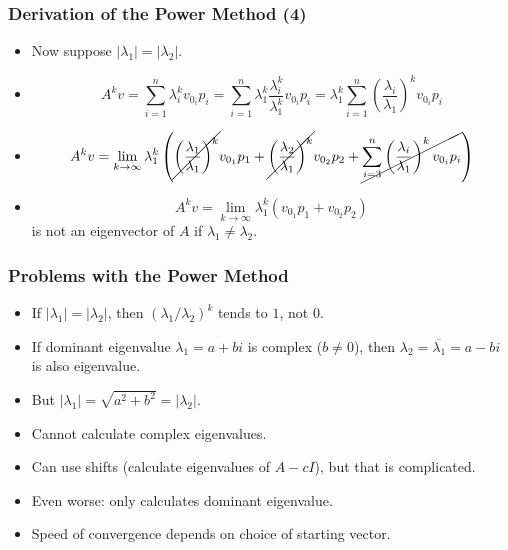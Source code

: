 \documentclass{beamer}
\begin{document}
\begin{frame}
	\frametitle{Derivation of the Power Method (4)}
	\begin{itemize}
		\item<1-> Now suppose $\left|\lambda_1\right|=\left|\lambda_2\right|$.
		\item<2->[]
		\begin{equation*}
			A^kv=\sum_{i=1}^{n}\lambda_i^k v_{0_i} p_i
			=\sum_{i=1}^{n}\lambda_1^k\frac{\lambda_i^k}{\lambda_1^k} v_{0_i} p_i
			=\lambda_1^k \sum_{i=1}^{n}\left(\frac{\lambda_i}{\lambda_1}\right)^k v_{0_i}p_i
		\end{equation*}
		\item<2->[]
		\begin{equation*}
			A^k v
			=\lim_{k\to\infty}\lambda_1^k \left(\cancel{\left(\frac{\lambda_1}{\lambda_1}\right)^k} v_{0_1}p_1+\cancel{\left(\frac{\lambda_2}{\lambda_1}\right)^k}v_{0_2}p_2+\cancel{\sum_{i=3}^{n}\left(\frac{\lambda_i}{\lambda_1}\right)^k v_{0_i}p_i}\right)
		\end{equation*}
		\item<2->[]
		\begin{equation*}
			A^k v
			=\lim_{k\to\infty}\lambda_1^k\left(v_{0_1}p_1+v_{0_2}p_2\right)
		\end{equation*}
		is not an eigenvector of $A$ if $\lambda_1\neq\lambda_2$.
	\end{itemize}
\end{frame}

\begin{frame}
	\frametitle{Problems with the Power Method}
	\begin{itemize}
		\item<1-> If $\left|\lambda_1\right|=\left|\lambda_2\right|$, then $(\lambda_1/\lambda_2)^k$ tends to $1$, not $0$.
		\item<2-> If dominant eigenvalue $\lambda_1=a+bi$ is complex ($b\neq0$), then $\lambda_2=\overline{\lambda_1}=a-bi$ is also eigenvalue.
		\item<3-> But $\left|\lambda_1\right|=\sqrt{a^2+b^2}=\left|\lambda_2\right|$.
		\item<4-> Cannot calculate complex eigenvalues.
		\item<5-> Can use shifts (calculate eigenvalues of $A-cI$), but that is complicated.
		\item<6-> Even worse: only calculates dominant eigenvalue.
		\item<7-> Speed of convergence depends on choice of starting vector.
	\end{itemize}
\end{frame}
\end{document}
